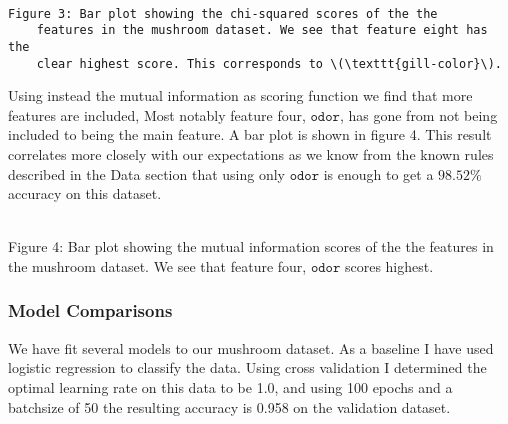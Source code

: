 \documentclass[11pt]{article}
\begin{document}
\begin{center}
\end{center}
{ \hspace*{\fill} \\}

\begin{Verbatim}[commandchars=\\\{\}]
	Figure 3: Bar plot showing the chi-squared scores of the the
	features in the mushroom dataset. We see that feature eight has the
	clear highest score. This corresponds to \(\texttt{gill-color}\).
\end{Verbatim}

Using instead the mutual information as scoring function we find that
more features are included, Most notably feature four,
\(\texttt{odor}\), has gone from not being included to being the main
feature. A bar plot is shown in figure 4. This result correlates
more closely with our expectations as we know from the known rules
described in the Data section that using only \(\texttt{odor}\) is
enough to get a \(98.52\%\) accuracy on this dataset.

    
\begin{center}
\end{center}
{ \hspace*{\fill} \\}
    Figure 4: Bar plot showing the mutual information scores of the the
features in the mushroom dataset. We see that feature four,
\(\texttt{odor}\) scores highest.

    \hypertarget{model-comparisons}{%
	\subsubsection{Model Comparisons}\label{model-comparisons}}

We have fit several models to our mushroom dataset. As a baseline I have used logistic regression to classify the data. Using cross validation I determined the optimal learning rate on this data to be 1.0, and using 100 epochs and a batchsize of 50 the resulting accuracy is 0.958 on the validation dataset.
\end{document}
